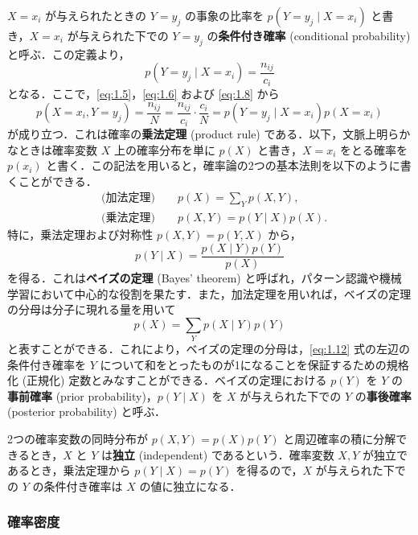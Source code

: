 \documentclass[uplatex,a4paper,oneside,openany,dvipdfmx]{jsarticle}
\numberwithin{equation}{section}
\theoremstyle{mystyle} %
\newcommand{\tb}[1]{\textbf{#1}}
\begin{document}
$X=x_{i}$ が与えられたときの $Y=y_{j}$ の事象の比率を $p(Y=y_{j} \mid X=x_{i})$ と書き，$X=x_{i}$ が与えられた下での $Y=y_{j}$ の\tb{条件付き確率} (conditional probability) と呼ぶ．この定義より，
\begin{equation} \label{eq:1.8}
    p(Y=y_{j} \mid X=x_{i}) = \frac{n_{ij}}{c_{i}}
\end{equation}
となる．ここで，\eqref{eq:1.5}，\eqref{eq:1.6} および \eqref{eq:1.8} から
\begin{equation}
    p(X=x_{i},Y=y_{j}) = \frac{n_{ij}}{N} = \frac{n_{ij}}{c_{i}} \cdot \frac{c_{i}}{N} = p(Y=y_{j} \mid X=x_{i}) p(X=x_{i})
\end{equation}
が成り立つ．これは確率の\tb{乗法定理} (product rule) である．以下，文脈上明らかなときは確率変数 $X$ 上の確率分布を単に $p(X)$ と書き，$X=x_{i}$ をとる確率を $p(x_{i})$ と書く．この記法を用いると，確率論の2つの基本法則を以下のように書くことができる．
\begin{align}
    &\textbf{(加法定理)} \qquad p(X) = \sum_{Y} p(X,Y),\label{eq:1.10}\\
    &\textbf{(乗法定理)} \qquad p(X,Y) = p(Y \mid X) p(X).\label{eq:1.11}
\end{align}
特に，乗法定理および対称性 $p(X,Y) = p(Y,X)$ から，
\begin{equation} \label{eq:1.12}
    p(Y \mid X) = \frac{p(X \mid Y)p(Y)}{p(X)}
\end{equation}
を得る．これは\tb{ベイズの定理} (Bayes' theorem) と呼ばれ，パターン認識や機械学習において中心的な役割を果たす．また，加法定理を用いれば，ベイズの定理の分母は分子に現れる量を用いて
\begin{equation}
    p(X) = \sum_{Y} p(X \mid Y)p(Y)
\end{equation}
と表すことができる．これにより，ベイズの定理の分母は，\eqref{eq:1.12} 式の左辺の条件付き確率を $Y$ について和をとったものが1になることを保証するための規格化 (正規化) 定数とみなすことができる．ベイズの定理における $p(Y)$ を $Y$ の\tb{事前確率} (prior probability)，$p(Y \mid X)$ を $X$ が与えられた下での $Y$ の\tb{事後確率} (posterior probability) と呼ぶ．

2つの確率変数の同時分布が $p(X,Y) = p(X)p(Y)$ と周辺確率の積に分解できるとき，$X$ と $Y$ は\tb{独立} (independent) であるという．確率変数 $X,Y$ が独立であるとき，乗法定理から $p(Y \mid X) = p(Y)$ を得るので，$X$ が与えられた下での $Y$ の条件付き確率は $X$ の値に独立になる．

\subsubsection{確率密度}
\end{document}
